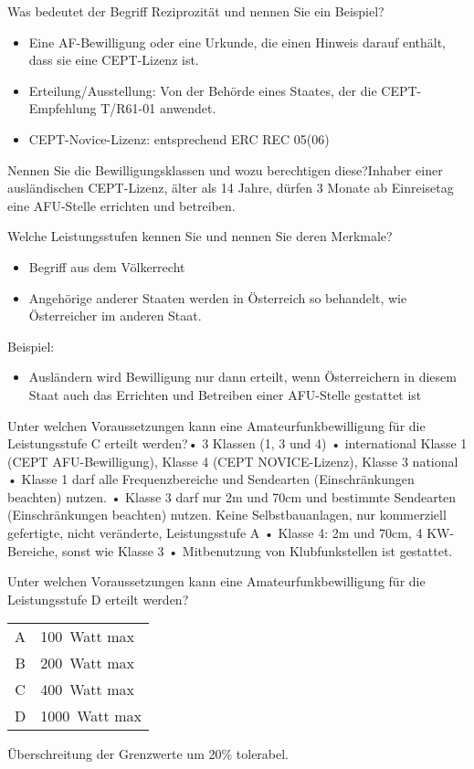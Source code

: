 \documentclass[avery5371,grid,frame,a4paper]{flashcards}
\newcommand{\card}[3]{
  \begin{flashcard}[{\chap} -- #1]{#2}#3\end{flashcard}
}
\begin{document}
\card{41}{Was bedeutet der Begriff Reziprozität und nennen Sie ein Beispiel?}{\begin{itemize}\itemsep1pt \item Eine AF-Bewilligung oder eine Urkunde, die einen Hinweis darauf enthält, dass sie eine CEPT-Lizenz ist. \item Erteilung/Ausstellung: Von der Behörde eines Staates, der die CEPT-Empfehlung T/R61-01 anwendet. \item CEPT-Novice-Lizenz: entsprechend ERC
REC 05(06)\end{itemize}}

\card{42}{Nennen Sie die Bewilligungsklassen und wozu berechtigen diese?}{Inhaber einer ausländischen CEPT-Lizenz, älter als 14 Jahre, dürfen 3 Monate ab Einreisetag eine AFU-Stelle errichten und betreiben.}

\card{43}{Welche Leistungsstufen kennen Sie und nennen Sie deren Merkmale?}{\begin{itemize}\itemsep1pt \item Begriff aus dem Völkerrecht \item Angehörige anderer Staaten werden in
Österreich so behandelt, wie Österreicher im anderen Staat. \end{itemize}
Beispiel: \begin{itemize}\itemsep1pt \item Ausländern wird Bewilligung nur dann erteilt, wenn Österreichern in diesem Staat auch das Errichten und Betreiben einer AFU-Stelle gestattet ist \end{itemize}}

\card{44}{Unter welchen Voraussetzungen kann eine Amateurfunkbewilligung für die Leistungsstufe C erteilt werden?}{•  3 Klassen (1, 3 und 4) •  international Klasse 1 (CEPT AFU-Bewilligung), Klasse 4 (CEPT NOVICE-Lizenz), Klasse 3 national •  Klasse 1 darf alle Frequenzbereiche und Sendearten (Einschränkungen beachten) nutzen. •  Klasse 3 darf nur 2m und 70cm und bestimmte Sendearten (Einschränkungen beachten) nutzen. Keine Selbstbauanlagen, nur kommerziell gefertigte, nicht veränderte, Leistungsstufe A •  Klasse 4: 2m und 70cm, 4 KW-Bereiche, sonst wie Klasse 3 •  Mitbenutzung von Klubfunkstellen ist gestattet.}

\card{45}{Unter welchen Voraussetzungen kann eine Amateurfunkbewilligung für die Leistungsstufe D erteilt werden?}{
  \begin{center}
    \vspace{5pt}
    \begin{tabular}{cl}
      A & 100~Watt max \\
      B & 200~Watt max \\
      C & 400~Watt max \\
      D & 1000~Watt max
    \end{tabular}
  \end{center}
  Überschreitung der Grenzwerte um 20\% tolerabel.
}
\end{document}
